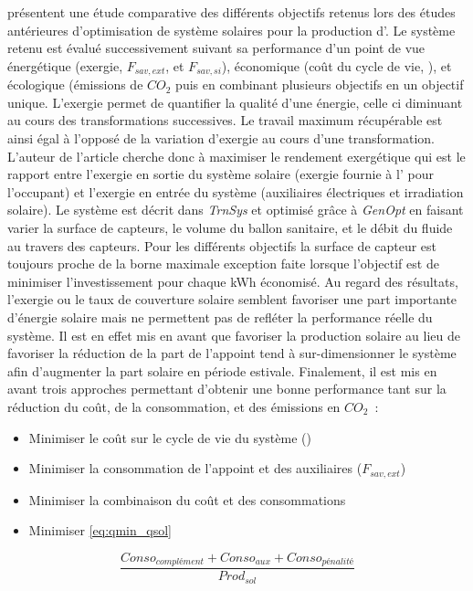 \textcite{Fraisse2009232} présentent une étude comparative des différents objectifs retenus lors des études antérieures
d’optimisation de système solaires pour la production d’. Le système retenu est
évalué successivement suivant sa performance d’un point de vue énergétique (exergie,
$F_{sav, ext}$, et $F_{sav, si}$), économique (coût du cycle de vie, ), et
écologique (émissions de $CO_{2}$ puis en combinant plusieurs objectifs en un objectif
unique. L’exergie permet de quantifier la qualité d’une énergie, celle ci diminuant au cours des
transformations successives. Le travail maximum récupérable est ainsi égal à l’opposé de
la variation d’exergie au cours d’une transformation. L’auteur de l’article
cherche donc à maximiser le rendement exergétique qui est le rapport entre l’exergie en
sortie du système solaire (exergie fournie à l’ pour l’occupant) et l’exergie
en entrée du système (auxiliaires électriques et irradiation solaire).
Le système est décrit dans \textit{TrnSys} et optimisé grâce à
\textit{GenOpt} en faisant varier la surface de capteurs, le volume du ballon sanitaire,
et le débit du fluide au travers des capteurs. Pour les différents objectifs la surface de
capteur est toujours proche de la borne maximale exception faite lorsque l’objectif est de
minimiser l’investissement pour chaque
\si{kWh} économisé. Au regard des résultats, l’exergie ou le taux de couverture solaire
semblent favoriser une part importante d’énergie solaire mais ne permettent pas de refléter
la performance réelle du système. Il est en effet mis en avant que favoriser la production
solaire au lieu de favoriser la réduction de la part de l’appoint tend à sur-dimensionner
le système afin d’augmenter la part solaire en période estivale. Finalement, il est mis en
avant trois approches permettant d’obtenir une  bonne performance tant sur la réduction du
coût, de la consommation, et des émissions en $CO_{2}$~:
\begin{itemize}
    \item Minimiser le coût sur le cycle de vie du système ()
    \item Minimiser la consommation de l’appoint et des auxiliaires ($F_{sav, ext}$)
    \item Minimiser la combinaison du coût et des consommations
    \item Minimiser \eqref{eq:qmin_qsol}
\end{itemize}

\begin{equation}\label{eq:qmin_qsol}
    \frac{Conso_{complément} + Conso_{aux} + Conso_{pénalité}}{Prod_{sol}}
\end{equation}


